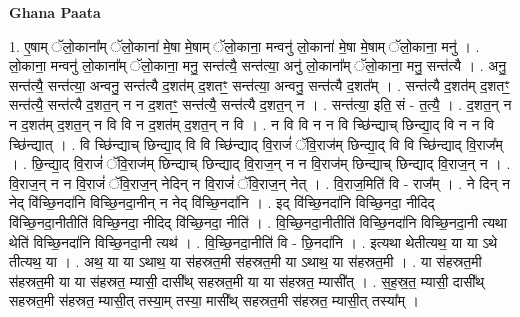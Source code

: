 \documentclass[17pt]{extarticle}
\begin{document}
\textbf{Ghana Paata } \newline

1. ए॒षाम् ॅलो॒काना᳚म् ॅलो॒काना॑ मे॒षा मे॒षाम् ॅलो॒काना॒ मन्वनु॑ लो॒काना॑ मे॒षा मे॒षाम् ॅलो॒काना॒ मनु॑ । . लो॒काना॒ मन्वनु॑ लो॒काना᳚म् ॅलो॒काना॒ मनु॒ सन्त॑त्यै॒ सन्त॑त्या॒ अनु॑ लो॒काना᳚म् ॅलो॒काना॒ मनु॒ सन्त॑त्यै । . अनु॒ सन्त॑त्यै॒ सन्त॑त्या॒ अन्वनु॒ सन्त॑त्यै द॒शत॑म् द॒शतꣳ॒॒ सन्त॑त्या॒ अन्वनु॒ सन्त॑त्यै द॒शत᳚म् । . सन्त॑त्यै द॒शत॑म् द॒शतꣳ॒॒ सन्त॑त्यै॒ सन्त॑त्यै द॒शत॒न् न न द॒शतꣳ॒॒ सन्त॑त्यै॒ सन्त॑त्यै द॒शत॒न् न । . सन्त॑त्या॒ इति॒ सं - त॒त्यै॒ । . द॒शत॒न् न न द॒शत॑म् द॒शत॒न् न वि वि न द॒शत॑म् द॒शत॒न् न वि । . न वि वि न न वि च्छि॑न्द्याच् छिन्द्या॒द् वि न न वि च्छि॑न्द्यात् । . वि च्छि॑न्द्याच् छिन्द्या॒द् वि वि च्छि॑न्द्याद् वि॒राजं॑ ॅवि॒राज॑म् छिन्द्या॒द् वि वि च्छि॑न्द्याद् वि॒राज᳚म् । . छि॒न्द्या॒द् वि॒राजं॑ ॅवि॒राज॑म् छिन्द्याच् छिन्द्याद् वि॒राज॒न् न न वि॒राज॑म् छिन्द्याच् छिन्द्याद् वि॒राज॒न् न । . वि॒राज॒न् न न वि॒राजं॑ ॅवि॒राज॒न् नेदिन् न वि॒राजं॑ ॅवि॒राज॒न् नेत् । . वि॒राज॒मिति॑ वि - राज᳚म् । . ने दिन् न नेद् वि॑च्छि॒नदा॑नि विच्छि॒नदा॒नीन् न नेद् वि॑च्छि॒नदा॑नि । . इद् वि॑च्छि॒नदा॑नि विच्छि॒नदा॒ नीदिद् वि॑च्छि॒नदा॒नीतीति॑ विच्छि॒नदा॒ नीदिद् वि॑च्छि॒नदा॒ नीति॑ । . वि॒च्छि॒नदा॒नीतीति॑ विच्छि॒नदा॑नि विच्छि॒नदा॒नी त्यथा थेति॑ विच्छि॒नदा॑नि विच्छि॒नदा॒नी त्यथ॑ । . वि॒च्छि॒नदा॒नीति॑ वि - छि॒नदा॑नि । . इत्यथा थेतीत्यथ॒ या या ऽथे तीत्यथ॒ या । . अथ॒ या या ऽथाथ॒ या स॑हस्रत॒मी स॑हस्रत॒मी या ऽथाथ॒ या स॑हस्रत॒मी । . या स॑हस्रत॒मी स॑हस्रत॒मी या या स॑हस्रत॒ म्यासी॒ दासी᳚थ् सहस्रत॒मी या या स॑हस्रत॒ म्यासी᳚त् । . स॒ह॒स्र॒त॒ म्यासी॒ दासी᳚थ् सहस्रत॒मी स॑हस्रत॒ म्यासी॒त् तस्या॒म् तस्या॒ मासी᳚थ् सहस्रत॒मी स॑हस्रत॒ म्यासी॒त् तस्या᳚म् । \newline
\end{document}
